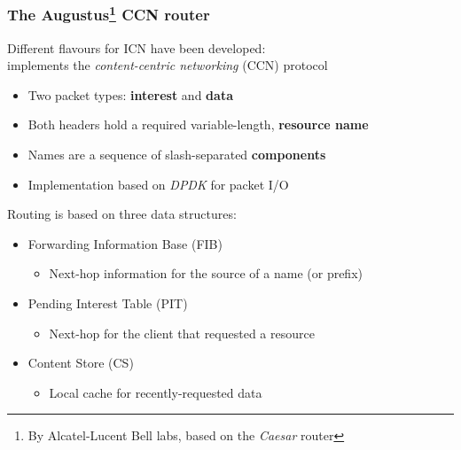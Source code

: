 \begin{frame}[fragile]
  \frametitle{The Augustus\footnote{By Alcatel-Lucent Bell labs, based on the \textit{Caesar} \cite{caesar} router} CCN router}
  Different flavours for ICN have been developed:\\
  implements the \emph{content-centric networking} (CCN) protocol
  \vspace{-6pt}
  \begin{itemize}
    \item Two packet types: \textbf{interest} and \textbf{data} \cite{icn-packet}
    \item Both headers hold a required variable-length, \textbf{resource name}
    \item Names are a sequence of slash-separated \textbf{components}
    \item Implementation based on \emph{DPDK} for packet I/O \cite{dpdk}
  \end{itemize}
  Routing is based on three data structures:
  \vspace{-6pt}
  \begin{itemize}
    \item Forwarding Information Base (FIB)
      \begin{itemize}
        \item Next-hop information for the source of a name (or prefix)
      \end{itemize}
    \item Pending Interest Table (PIT)
      \begin{itemize}
        \item Next-hop for the client that requested a resource
      \end{itemize}
    \item Content Store (CS)
      \begin{itemize}
        \item Local cache for recently-requested data
      \end{itemize}
  \end{itemize}
\end{frame}

